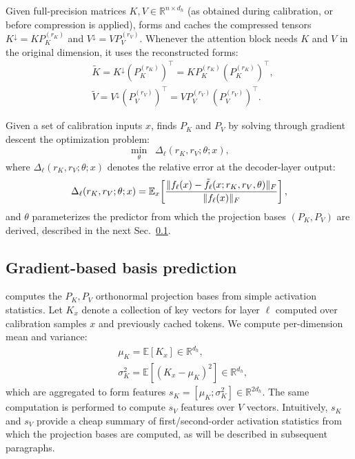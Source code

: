 Given full-precision matrices $K,V\in\mathbb{R}^{n\times d_h}$ (as obtained during calibration, or before compression is applied), \methodname forms and caches the compressed tensors
$K^{\downarrow}=K P_K^{(r_K)}$ and $V^{\downarrow}=V P_V^{(r_V)}$.
Whenever the attention block needs $K$ and $V$ in the original dimension, it uses the reconstructed forms:
\begin{equation}
\begin{aligned}
&\tilde K = K^{\downarrow}(P_K^{(r_K)})^\top = K P_K^{(r_K)}(P_K^{(r_K)})^\top,\\
&\tilde V = V^{\downarrow}(P_V^{(r_V)})^\top = V P_V^{(r_V)}(P_V^{(r_V)})^\top.
\end{aligned}
\label{eq:dkv_reconstruct}
\end{equation}

Given a set of calibration inputs $x$, \methodname finds $P_K$ and $P_V$ by solving through gradient descent the optimization problem:
\begin{equation}
\min_{\theta}\;\; \Delta_\ell(r_K,r_V;\theta;x),
\label{eq:dkv_obj}
\end{equation}
where $\Delta_\ell(r_K,r_V;\theta;x)$ denotes the relative error at the decoder-layer output:
\begin{equation}
\small
\Delta_\ell(r_K,r_V;\theta;x)
=
\mathbb{E}_{x}\!\left[
\frac{\| f_\ell(x) - \tilde{f}_\ell(x; r_K,r_V,\theta) \|_F}{\| f_\ell(x) \|_F}
\right],
\label{eq:dkv_delta}
\end{equation}
and $\theta$ parameterizes the predictor from which the projection bases $(P_K,P_V)$ are derived, described in the next Sec.~\ref{subsec:methods_basis_prediction}.

\subsection{Gradient-based basis prediction}
\label{subsec:methods_basis_prediction}
\methodname computes the $P_K, P_V$ orthonormal projection bases from simple activation statistics.
Let $K_x$ denote a collection of key vectors for layer $\ell$ computed over calibration samples $x$ and previously cached tokens.
We compute per-dimension mean and variance:
\begin{equation}
\begin{aligned}
&\mu_K = \mathbb{E}[K_x] \in \mathbb{R}^{d_h},\\
&\sigma_K^2 = \mathbb{E}\!\left[(K_x-\mu_K)^2\right] \in \mathbb{R}^{d_h},
\end{aligned}
\label{eq:dkv_stats}
\end{equation}
which are aggregated to form features $s_K=[\mu_K;\sigma_K^2]\in\mathbb{R}^{2d_h}$.
The same computation is performed to compute $s_V$ features over $V$ vectors.
Intuitively, $s_K$ and $s_V$ provide a cheap summary of first/second-order activation statistics from which the projection bases are computed, as will be described in subsequent paragraphs.
%
